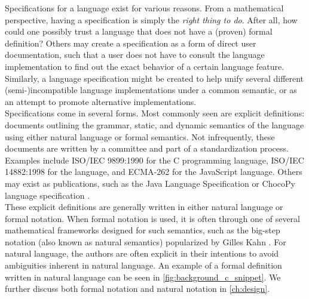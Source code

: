 Specifications for a language exist for various reasons. From a mathematical perspective, having a specification is simply the \textit{right thing to do}. After all, how could one possibly trust a language that does not have a (proven) formal definition? Others may create a specification as a form of direct user documentation, such that a user does not have to consult the language implementation to find out the exact behavior of a certain language feature. Similarly, a language specification might be created to help unify several different (semi-)incompatible language implementations under a common semantic, or as an attempt to promote alternative implementations.\\

Specifications come in several forms. Most commonly seen are explicit definitions: documents outlining the grammar, static, and dynamic semantics of the language using either natural language or formal semantics. Not infrequently, these documents are written by a committee and part of a standardization process. Examples include ISO/IEC 9899:1990 \cite{ISO:1990:IIP} for the C programming language, ISO/IEC 14882:1998 \cite{ISO:1998:IIP} for the \Cplusplus language, and ECMA-262 \cite{ecma1999262} for the JavaScript language. Others may exist as publications, such as the Java Language Specification \cite{10.5555/2636997} or ChocoPy language specification \cite{PadhyeSH19}.\\

These explicit definitions are generally written in either natural language or formal notation. When formal notation is used, it is often through one of several mathematical frameworks designed for such semantics, such as the big-step notation (also known as natural semantics) popularized by Gilles Kahn \cite{Kahn87:0}. For natural language, the authors are often explicit in their intentions to avoid ambiguities inherent in natural language. An example of a formal definition written in natural language can be seen in \cref{fig:background_c_snippet}. We further discuss both formal notation and natural notation in \cref{ch:design}.\\

